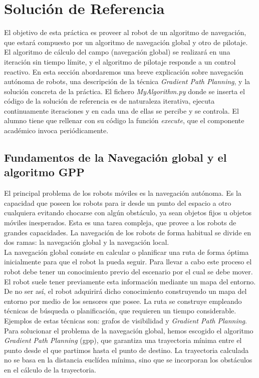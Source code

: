 \section{Solución de Referencia}\label{sec.solucion}
El objetivo de esta práctica es proveer al robot de un algoritmo de navegación, que estará compuesto por un algoritmo de navegación global y otro de pilotaje. El algoritmo de cálculo del campo (navegación global) se realizará en una iteración sin tiempo límite, y el algoritmo de pilotaje responde a un control reactivo. En esta sección abordaremos una breve explicación sobre navegación autónoma de robots, una descripción de la técnica \textit{Gradient Path Planning}, y la solución concreta de la práctica. El fichero \textit{MyAlgorithm.py} donde se inserta el código de la solución de referencia es de naturaleza iterativa, ejecuta continuamente iteraciones y en cada una de ellas se percibe y se controla. El alumno tiene que rellenar con su código la función \textit{execute}, que el componente académico invoca periódicamente.

\subsection{Fundamentos de la Navegación global y el algoritmo GPP}
El principal problema de los robots móviles es la navegación autónoma. Es la capacidad que poseen los robots para ir desde un punto del espacio a otro cualquiera evitando chocarse con algún obstáculo, ya sean objetos fijos u objetos móviles inesperados. Esta es una tarea compleja, que provee a los robots de grandes capacidades. La navegación de los robots de forma habitual se divide en dos ramas: la navegación global y la navegación local.\\

La navegación global consiste en calcular o planificar una ruta de forma óptima inicialmente para que el robot la pueda seguir. Para llevar a cabo este proceso el robot debe tener un conocimiento previo del escenario por el cual se debe mover. El robot suele tener previamente esta información mediante un mapa del entorno. De no ser así, el robot adquirirá dicho conocimiento construyendo un mapa del entorno por medio de los sensores que posee. La ruta se construye empleando técnicas de búsqueda o planificación, que requieren un tiempo considerable. Ejemplos de estas técnicas son: grafos de visibilidad y \textit{Gradient Path Planning}.\\

Para solucionar el problema de la navegación global, hemos escogido el algoritmo \textit{Gradient Path Planning} (\acrshort{gpp}), que garantiza una trayectoria mínima entre el punto desde el que partimos hasta el punto de destino. La trayectoria calculada no se basa en la distancia euclídea mínima, sino que se incorporan los obstáculos en el cálculo de la trayectoria.\\

